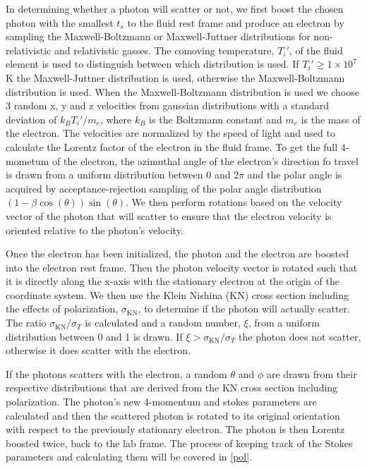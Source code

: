 \documentclass[12pt,a4paper]{article}
\begin{document}
In determining whether a photon will scatter or not, we first boost the chosen photon with the smallest $t_s$ to the fluid rest frame and produce an electron by sampling the Maxwell-Boltzmann or Maxwell-Juttner distributions for non-relativistic and relativistic gasses. The comoving temperature, $T_i'$, of the fluid element is used to distinguish between which distribution is used. If $T_i' \ge 1 \times 10^7$ K the Maxwell-Juttner distribution is used, otherwise the Maxwell-Boltzmann distribution is used. When the Maxwell-Boltzmann distribution is used we choose 3 random x, y and z velocities from gaussian distributions with a standard deviation of $k_BT_i'/m_e$, where $k_B$ is the Boltzmann constant and $m_e$ is the mass of the electron. The velocities are normalized by the speed of light and used to calculate the Lorentz factor of the electron in the fluid frame. To get the full 4-mometum of the electron, the azimuthal angle of the electron's direction fo travel is drawn from a uniform distribution between 0 and $2\pi$ and the polar angle is acquired by acceptance-rejection sampling of the polar angle distribution $(1-\beta\cos(\theta))\sin(\theta) $. We then perform rotations based on the velocity vector of the photon that will scatter to ensure that the electron velocity is oriented relative to the photon's velocity.

Once the electron has been initialized, the photon and the electron are boosted into the electron rest frame. Then the photon velocity vector is rotated such that it is directly along the x-axis with the stationary electron at the origin of the coordinate system. We then use the Klein Nishina (KN) cross section including the effects of polarization, $\sigma_\mathrm{KN}$, to determine if the photon will actually scatter. The ratio $\sigma_\mathrm{KN}/\sigma_T$ is calculated and a random number, $\xi$, from a uniform distribution between 0 and 1 is drawn. If $\xi >\sigma_\mathrm{KN}/\sigma_T $ the photon does not scatter, otherwise it does scatter with the electron. 

If the photons scatters with the electron, a random $\theta$ and $\phi$ are drawn from their respective distributions that are derived from the KN cross section including polarization. The photon's new 4-momentum and stokes parameters are calculated and then the scattered photon is rotated to its original orientation with respect to the previously stationary electron. The photon is then Lorentz boosted twice, back to the lab frame. The process of keeping track of the Stokes parameters and calculating them will be covered in \autoref{pol}.
\end{document}
